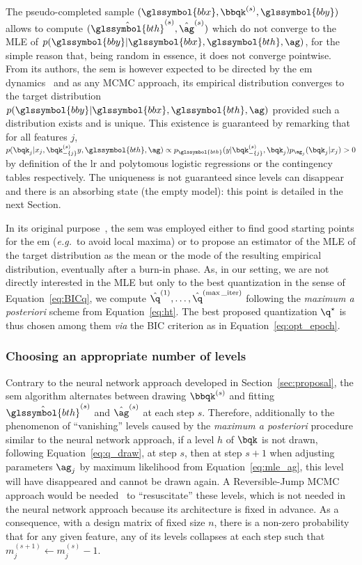 The pseudo-completed sample $(\glssymbol{bbx}, \bbqk^{(s)}, \glssymbol{bby})$ allows to compute $(\hat{\glssymbol{bth}}^{(s)},\hat{\ag}^{(s)})$ which do not converge to the MLE of $p(\glssymbol{bby} | \glssymbol{bbx}, \glssymbol{bth}, \ag)$, for the simple reason that, being random in essence, it does not converge pointwise. From its authors, the \gls{sem} is however expected to be directed by the \gls{em} dynamics~\cite{celeux_sem} and as any MCMC approach, its empirical distribution converges to the target distribution $p(\glssymbol{bby} | \glssymbol{bbx}, \glssymbol{bth}, \ag)$ provided such a distribution exists and is unique. This existence is guaranteed by remarking that for all features $j$, $ p(\bqk_j | x_j, \bqk^{(s)}_{-\{j\}} y, \glssymbol{bth}, \ag) \propto p_{\glssymbol{bth}}(y | \bqk^{(s)}_{-\{j\}}, \bqk_j) p_{\ag_j}(\bqk_j | x_j) > 0 $ by definition of the \gls{lr} and polytomous logistic regressions or the contingency tables respectively. The uniqueness is not guaranteed since levels can disappear and there is an absorbing state (the empty model): this point is detailed in the next Section.

In its original purpose~\cite{celeux_sem}, the \gls{sem} was employed either to find good starting points for the \gls{em} (\textit{e.g.}\ to avoid local maxima) or to propose an estimator of the MLE of the target distribution as the mean or the mode of the resulting empirical distribution, eventually after a burn-in phase. As, in our setting, we are not directly interested in the MLE but only to the best quantization in the sense of Equation~\eqref{eq:BICq}, we compute $\hat{\q}^{(1)}, \dots, \hat{\q}^{(\max\_{\text{iter}})}$ following the \textit{maximum a posteriori} scheme from Equation~\eqref{eq:ht}. The best proposed quantization $\q^\star$ is thus chosen among them \textit{via} the BIC criterion as in Equation~\eqref{eq:opt_epoch}.

\subsubsection{Choosing an appropriate number of levels}

Contrary to the neural network approach developed in Section~\ref{sec:proposal}, the \gls{sem} algorithm alternates between drawing $\bbqk^{(s)}$ and fitting $\hat{\glssymbol{bth}}^{(s)}$ and $\hat{\ag}^{(s)}$  at each step $s$. Therefore, additionally to the phenomenon of ``vanishing'' levels caused by the \textit{maximum a posteriori} procedure similar to the neural network approach, if a level $h$ of $\bqk$ is not drawn, following Equation~\eqref{eq:q_draw}, at step $s$, then at step $s+1$ when adjusting parameters $\ag_j$ by maximum likelihood from Equation~\eqref{eq:mle_ag}, this level will have disappeared and cannot be drawn again. A Reversible-Jump MCMC approach would be needed~\cite{green1995reversible} to ``resuscitate'' these levels, which is not needed in the neural network approach because its architecture is fixed in advance. As a consequence, with a design matrix of fixed size $n$, there is a non-zero probability that for any given feature, any of its levels collapses at each step such that $m_j^{(s+1)} \leftarrow m_j^{(s)} - 1$.

